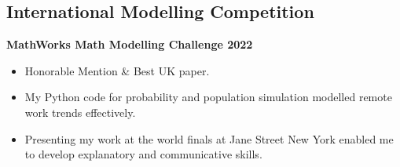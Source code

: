 \documentclass{Resume}
\begin{document}
		\subsection{International Modelling Competition}
			\textbf{MathWorks Math Modelling Challenge 2022} 
			\begin{itemize}
			    \item Honorable Mention \& Best UK paper.
			    \item My Python code for probability and population simulation modelled remote work trends effectively.
			    \item Presenting my work at the world finals at Jane Street New York enabled me to develop explanatory and communicative skills.
			\end{itemize}


\end{document}
